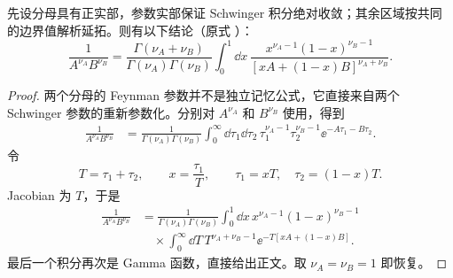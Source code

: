 \begin{proposition}
先设分母具有正实部，参数实部保证 Schwinger 积分绝对收敛；其余区域按共同的边界值解析延拓。则有以下结论（原式 ）：
\begin{equation*}
\boxed{
\frac1{A^{\nu_A}B^{\nu_B}}
=\frac{\Gamma(\nu_A+\nu_B)}{\Gamma(\nu_A)\Gamma(\nu_B)}
\int_0^1\dd x\,
\frac{x^{\nu_A-1}(1-x)^{\nu_B-1}}
{[xA+(1-x)B]^{\nu_A+\nu_B}}.}
\end{equation*}
\end{proposition}
\begin{proof}
两个分母的 Feynman 参数并不是独立记忆公式，它直接来自两个 Schwinger 参数的重新参数化。分别对 $A^{\nu_A}$ 和 $B^{\nu_B}$ 使用，得到
\begin{align*}
 \frac1{A^{\nu_A}B^{\nu_B}}
 &=\frac1{\Gamma(\nu_A)\Gamma(\nu_B)}
 \int_0^\infty\dd\tau_1\dd\tau_2\,
 \tau_1^{\nu_A-1}\tau_2^{\nu_B-1}
 \ee^{-A\tau_1-B\tau_2}.
\end{align*}
令
\begin{equation*}
 T=\tau_1+\tau_2,
 \qquad x=\frac{\tau_1}{T},
 \qquad
 \tau_1=xT,
 \quad \tau_2=(1-x)T.
\end{equation*}
Jacobian 为 $T$，于是
\begin{align*}
 \frac1{A^{\nu_A}B^{\nu_B}}
 &=\frac1{\Gamma(\nu_A)\Gamma(\nu_B)}
 \int_0^1\dd x\,x^{\nu_A-1}(1-x)^{\nu_B-1}\\
 &\quad\times\int_0^\infty\dd T\,
 T^{\nu_A+\nu_B-1}
 \ee^{-T[xA+(1-x)B]}.
\end{align*}
最后一个积分再次是 Gamma 函数，直接给出正文。取 $\nu_A=\nu_B=1$ 即恢复。
\end{proof}


